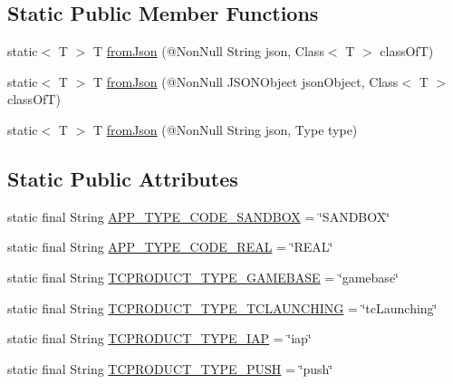 \subsection*{Static Public Member Functions}
\begin{DoxyCompactItemize}
\item 
static$<$ T $>$ T \hyperlink{classcom_1_1toast_1_1android_1_1gamebase_1_1base_1_1_value_object_ae6655c88c20a9a8406dc11b46250ac7b}{from\+Json} (@Non\+Null String json, Class$<$ T $>$ class\+OfT)
\item 
static$<$ T $>$ T \hyperlink{classcom_1_1toast_1_1android_1_1gamebase_1_1base_1_1_value_object_ab83c4196ee2e3f11553bbe0f04dc2101}{from\+Json} (@Non\+Null J\+S\+O\+N\+Object json\+Object, Class$<$ T $>$ class\+OfT)
\item 
static$<$ T $>$ T \hyperlink{classcom_1_1toast_1_1android_1_1gamebase_1_1base_1_1_value_object_aa901d97d495150b54bcb80c05672f58a}{from\+Json} (@Non\+Null String json, Type type)
\end{DoxyCompactItemize}
\subsection*{Static Public Attributes}
\begin{DoxyCompactItemize}
\item 
static final String \hyperlink{classcom_1_1toast_1_1android_1_1gamebase_1_1launching_1_1data_1_1_launching_info_a5ba5d878cb73e1c090f843e85b2a6904}{A\+P\+P\+\_\+\+T\+Y\+P\+E\+\_\+\+C\+O\+D\+E\+\_\+\+S\+A\+N\+D\+B\+OX} = \char`\"{}S\+A\+N\+D\+B\+OX\char`\"{}
\item 
static final String \hyperlink{classcom_1_1toast_1_1android_1_1gamebase_1_1launching_1_1data_1_1_launching_info_a994894cdc073f9f1a50e60ada7114735}{A\+P\+P\+\_\+\+T\+Y\+P\+E\+\_\+\+C\+O\+D\+E\+\_\+\+R\+E\+AL} = \char`\"{}R\+E\+AL\char`\"{}
\item 
static final String \hyperlink{classcom_1_1toast_1_1android_1_1gamebase_1_1launching_1_1data_1_1_launching_info_a4fbe966df1c56b729cc1d32fe7c1ff01}{T\+C\+P\+R\+O\+D\+U\+C\+T\+\_\+\+T\+Y\+P\+E\+\_\+\+G\+A\+M\+E\+B\+A\+SE} = \char`\"{}gamebase\char`\"{}
\item 
static final String \hyperlink{classcom_1_1toast_1_1android_1_1gamebase_1_1launching_1_1data_1_1_launching_info_ad60da783f693784ae720929f4e983121}{T\+C\+P\+R\+O\+D\+U\+C\+T\+\_\+\+T\+Y\+P\+E\+\_\+\+T\+C\+L\+A\+U\+N\+C\+H\+I\+NG} = \char`\"{}tc\+Launching\char`\"{}
\item 
static final String \hyperlink{classcom_1_1toast_1_1android_1_1gamebase_1_1launching_1_1data_1_1_launching_info_a35c254fe646d3c0c383b171d062dfefe}{T\+C\+P\+R\+O\+D\+U\+C\+T\+\_\+\+T\+Y\+P\+E\+\_\+\+I\+AP} = \char`\"{}iap\char`\"{}
\item 
static final String \hyperlink{classcom_1_1toast_1_1android_1_1gamebase_1_1launching_1_1data_1_1_launching_info_a363ed2a76c96a788962bab33a85cdf0b}{T\+C\+P\+R\+O\+D\+U\+C\+T\+\_\+\+T\+Y\+P\+E\+\_\+\+P\+U\+SH} = \char`\"{}push\char`\"{}
\end{DoxyCompactItemize}


